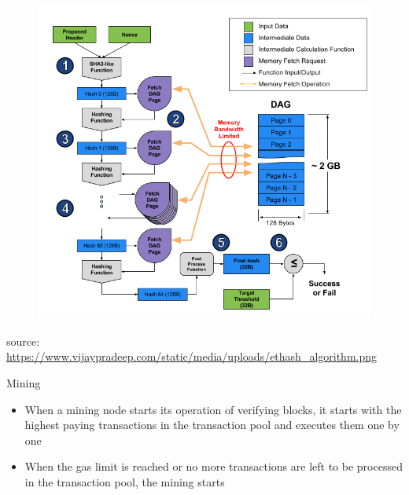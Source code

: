 \documentclass[11pt]{beamer}
\begin{document}

\begin{frame}
	\begin{figure}[]
		\centering
		\includegraphics  [scale=0.3]{Images/ethash}
	\end{figure}
	\begin{scriptsize}
		source: \href{https://www.vijaypradeep.com/blog/2017-04-28-ethereums-memory-hardness-explained/}{https://www.vijaypradeep.com/static/media/uploads/ethash\_algorithm.png}
	\end{scriptsize}
\end{frame}


\begin{frame}{Mining}
	\begin{itemize}
		\item When a mining node starts its operation of verifying blocks, it starts with the highest paying transactions in the transaction pool and executes them one by one
		\item When the gas limit is reached or no more transactions are left to be processed in the transaction pool, the mining starts
	\end{itemize}
\end{frame}
\end{document}
